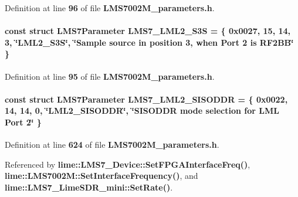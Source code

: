 Definition at line {\bf 96} of file {\bf L\+M\+S7002\+M\+\_\+parameters.\+h}.

\paragraph[{L\+M\+S7\+\_\+\+L\+M\+L2\+\_\+\+S3S}]{\setlength{\rightskip}{0pt plus 5cm}const struct {\bf L\+M\+S7\+Parameter} L\+M\+S7\+\_\+\+L\+M\+L2\+\_\+\+S3S = \{ 0x0027, 15, 14, 3, \char`\"{}\+L\+M\+L2\+\_\+\+S3\+S\char`\"{}, \char`\"{}\+Sample source in position 3, when Port 2 is R\+F2\+B\+B\char`\"{} \}\hspace{0.3cm}{\ttfamily [static]}}\label{LMS7002M__parameters_8h_a40830237682eef934192a67e97ba860a}


Definition at line {\bf 95} of file {\bf L\+M\+S7002\+M\+\_\+parameters.\+h}.

\paragraph[{L\+M\+S7\+\_\+\+L\+M\+L2\+\_\+\+S\+I\+S\+O\+D\+DR}]{\setlength{\rightskip}{0pt plus 5cm}const struct {\bf L\+M\+S7\+Parameter} L\+M\+S7\+\_\+\+L\+M\+L2\+\_\+\+S\+I\+S\+O\+D\+DR = \{ 0x0022, 14, 14, 0, \char`\"{}\+L\+M\+L2\+\_\+\+S\+I\+S\+O\+D\+D\+R\char`\"{}, \char`\"{}\+S\+I\+S\+O\+D\+D\+R mode selection for L\+M\+L Port 2\char`\"{} \}\hspace{0.3cm}{\ttfamily [static]}}\label{LMS7002M__parameters_8h_a8eb7d6008e15354ac9e6be87c5133d54}


Definition at line {\bf 624} of file {\bf L\+M\+S7002\+M\+\_\+parameters.\+h}.



Referenced by {\bf lime\+::\+L\+M\+S7\+\_\+\+Device\+::\+Set\+F\+P\+G\+A\+Interface\+Freq()}, {\bf lime\+::\+L\+M\+S7002\+M\+::\+Set\+Interface\+Frequency()}, and {\bf lime\+::\+L\+M\+S7\+\_\+\+Lime\+S\+D\+R\+\_\+mini\+::\+Set\+Rate()}.

